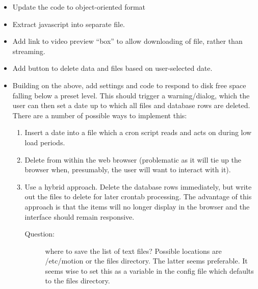 \documentclass[12pt]{scrartcl} %
\begin{document}
	\begin{itemize}
		\item Update the code to object-oriented format

		\item Extract javascript into separate file.

		\item Add link to video preview \enquote{box} to allow downloading of file, rather
		than streaming.

		\item Add button to delete data and files based on user-selected date.

		\item Building on the above, add settings and code to respond to disk free space falling below a preset level.
		This should trigger a warning/dialog, which the user can then set a date up to which
		all files and database rows are deleted. There are a number of possible ways to implement this:
		\begin{enumerate}
			\item Insert a date into a file which a cron script reads
			and acts on during low load periods.
			\item Delete from within the web browser
			(problematic as it will tie up the browser when, presumably,
			the user will want to interact with it).
			\item Use a hybrid approach. Delete the database rows immediately, but write out the files to delete for later crontab processing. The advantage of this approach is that the items will no longer display in the browser and the interface should remain responsive.
			\begin{description}
				\item [Question:] where to save the list of text files? Possible locations are /etc/motion or the files directory. The latter seems preferable. It seems wise to set this as a variable in the config file which defaults to the files directory.
			\end{description}
		\end{enumerate}

	\end{itemize}
\end{document}
